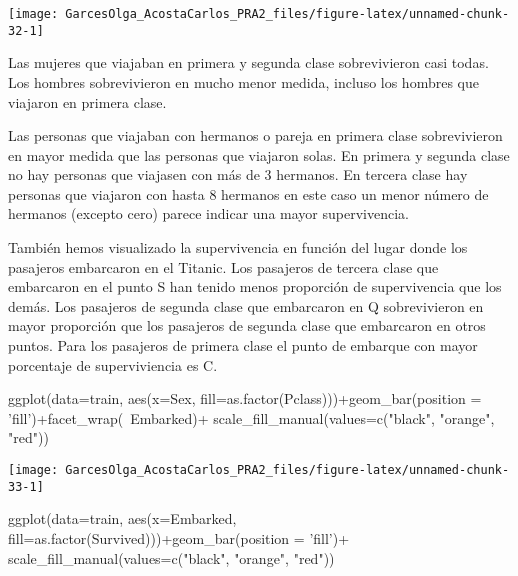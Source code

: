 \documentclass[
]{article}
\newenvironment{Shaded}{\begin{snugshade}}{\end{snugshade}}
\newcommand{\DataTypeTok}[1]{\textcolor[rgb]{0.87,0.87,0.75}{#1}}
\newcommand{\KeywordTok}[1]{\textcolor[rgb]{0.94,0.87,0.69}{#1}}
\newcommand{\NormalTok}[1]{\textcolor[rgb]{0.80,0.80,0.80}{#1}}
\newcommand{\OperatorTok}[1]{\textcolor[rgb]{0.94,0.94,0.82}{#1}}
\newcommand{\StringTok}[1]{\textcolor[rgb]{0.80,0.58,0.58}{#1}}
\begin{document}
\begin{center}\texttt{[image: GarcesOlga\_AcostaCarlos\_PRA2\_files/figure-latex/unnamed-chunk-32-1]} \end{center}

Las mujeres que viajaban en primera y segunda clase sobrevivieron casi
todas. Los hombres sobrevivieron en mucho menor medida, incluso los
hombres que viajaron en primera clase.

Las personas que viajaban con hermanos o pareja en primera clase
sobrevivieron en mayor medida que las personas que viajaron solas. En
primera y segunda clase no hay personas que viajasen con más de 3
hermanos. En tercera clase hay personas que viajaron con hasta 8
hermanos en este caso un menor número de hermanos (excepto cero) parece
indicar una mayor supervivencia.

También hemos visualizado la supervivencia en función del lugar donde
los pasajeros embarcaron en el Titanic. Los pasajeros de tercera clase
que embarcaron en el punto S han tenido menos proporción de
supervivencia que los demás. Los pasajeros de segunda clase que
embarcaron en Q sobrevivieron en mayor proporción que los pasajeros de
segunda clase que embarcaron en otros puntos. Para los pasajeros de
primera clase el punto de embarque con mayor porcentaje de
superviviencia es C.

\begin{Shaded}
\begin{Highlighting}[]
\KeywordTok{ggplot}\NormalTok{(}\DataTypeTok{data=}\NormalTok{train, }\KeywordTok{aes}\NormalTok{(}\DataTypeTok{x=}\NormalTok{Sex, }\DataTypeTok{fill=}\KeywordTok{as.factor}\NormalTok{(Pclass)))}\OperatorTok{+}\KeywordTok{geom_bar}\NormalTok{(}\DataTypeTok{position =} \StringTok{'fill'}\NormalTok{)}\OperatorTok{+}\KeywordTok{facet_wrap}\NormalTok{(}\OperatorTok{~}\NormalTok{Embarked)}\OperatorTok{+}\StringTok{ }\KeywordTok{scale_fill_manual}\NormalTok{(}\DataTypeTok{values=}\KeywordTok{c}\NormalTok{(}\StringTok{"black"}\NormalTok{, }\StringTok{"orange"}\NormalTok{, }\StringTok{"red"}\NormalTok{))}
\end{Highlighting}
\end{Shaded}

\begin{center}\texttt{[image: GarcesOlga\_AcostaCarlos\_PRA2\_files/figure-latex/unnamed-chunk-33-1]} \end{center}

\begin{Shaded}
\begin{Highlighting}[]
\KeywordTok{ggplot}\NormalTok{(}\DataTypeTok{data=}\NormalTok{train, }\KeywordTok{aes}\NormalTok{(}\DataTypeTok{x=}\NormalTok{Embarked, }\DataTypeTok{fill=}\KeywordTok{as.factor}\NormalTok{(Survived)))}\OperatorTok{+}\KeywordTok{geom_bar}\NormalTok{(}\DataTypeTok{position =} \StringTok{'fill'}\NormalTok{)}\OperatorTok{+}\StringTok{ }\KeywordTok{scale_fill_manual}\NormalTok{(}\DataTypeTok{values=}\KeywordTok{c}\NormalTok{(}\StringTok{"black"}\NormalTok{, }\StringTok{"orange"}\NormalTok{, }\StringTok{"red"}\NormalTok{))}
\end{Highlighting}
\end{Shaded}
\end{document}
